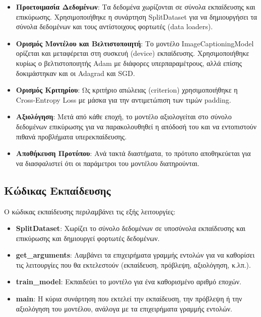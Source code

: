 \documentclass[conference]{IEEEtran}
\begin{document}
\begin{itemize}
    \item \textbf{Προετοιμασία Δεδομένων}: Τα δεδομένα χωρίζονται σε σύνολα εκπαίδευσης και επικύρωσης. Χρησιμοποιήθηκε η συνάρτηση \textlatin{SplitDataset} για να δημιουργήσει τα σύνολα δεδομένων και τους αντίστοιχους φορτωτές (\textlatin{data loaders}).
    \item \textbf{Ορισμός Μοντέλου και Βελτιστοποιητή}: Το μοντέλο \textlatin{ImageCaptioningModel} ορίζεται και μεταφέρεται στη συσκευή (\textlatin{device}) εκπαίδευσης. Χρησιμοποιήθηκε κυρίως ο βελτιστοποιητής \textlatin{Adam} με διάφορες υπερπαραμέτρους, αλλά επίσης δοκιμάστηκαν και οι \textlatin{Adagrad} και \textlatin{SGD}.
    \item \textbf{Ορισμός Κριτηρίου}: Ως κριτήριο απώλειας (\textlatin{criterion}) χρησιμοποιήθηκε η \textlatin{Cross-Entropy Loss} με μάσκα για την αντιμετώπιση των τιμών \textlatin{padding}.
    \item \textbf{Αξιολόγηση}: Μετά από κάθε εποχή, το μοντέλο αξιολογείται στο σύνολο δεδομένων επικύρωσης για να παρακολουθηθεί η απόδοσή του και να εντοπιστούν πιθανά προβλήματα υπερεκπαίδευσης.
    \item \textbf{Αποθήκευση Προτύπου}: Ανά τακτά διαστήματα, το πρότυπο αποθηκεύεται για να διασφαλιστεί ότι οι παράμετροι του μοντέλου διατηρούνται.
\end{itemize}

\subsection{Κώδικας Εκπαίδευσης}

Ο κώδικας εκπαίδευσης περιλαμβάνει τις εξής λειτουργίες:

\begin{itemize}
    \item \textbf{\textlatin{SplitDataset}}: Χωρίζει το σύνολο δεδομένων σε υποσύνολα εκπαίδευσης και επικύρωσης και δημιουργεί φορτωτές δεδομένων.
    \item \textbf{\textlatin{get\_arguments}}: Λαμβάνει τα επιχειρήματα γραμμής εντολών για να καθορίσει τις λειτουργίες που θα εκτελεστούν (εκπαίδευση, πρόβλεψη, αξιολόγηση, κ.λπ.).
    \item \textbf{\textlatin{train\_model}}: Εκπαιδεύει το μοντέλο για ένα καθορισμένο αριθμό εποχών.
    \item \textbf{\textlatin{main}}: Η κύρια συνάρτηση που εκτελεί την εκπαίδευση, την πρόβλεψη ή την αξιολόγηση του μοντέλου, ανάλογα με τα επιχειρήματα γραμμής εντολών.
\end{itemize}
\end{document}
